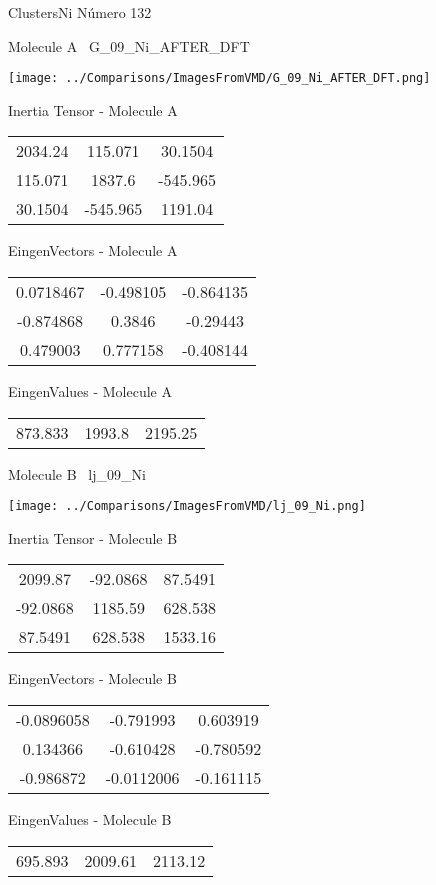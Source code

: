 \newpage

\vtab[-3cm]
\begin{center}
{\large ClustersNi \tab Número 132}
\end{center}
\begin{multicols}{2}
\begin{center}

Molecule A \
G\_09\_Ni\_AFTER\_DFT

\texttt{[image: ../Comparisons/ImagesFromVMD/G\_09\_Ni\_AFTER\_DFT.png]}

Inertia Tensor - Molecule A \\
\begin{tabular}{|c c c|}
2034.24	 & 	115.071	 & 	30.1504	 \\
115.071	 & 	1837.6	 & 	-545.965	 \\
30.1504	 & 	-545.965	 & 	1191.04
\end{tabular}

\vtab
 EingenVectors - Molecule A     \\
\begin{tabular}{|c c c|}
0.0718467	 & 	-0.498105	 & 	-0.864135	 \\
-0.874868	 & 	0.3846	 & 	-0.29443	 \\
0.479003	 & 	0.777158	 & 	-0.408144
\end{tabular}

\vtab
 EingenValues - Molecule A     \\
\begin{tabular}{|c c c|}
873.833	 & 	1993.8	 & 	2195.25	 \\
\end{tabular}
\columnbreak

Molecule B \
lj\_09\_Ni

\texttt{[image: ../Comparisons/ImagesFromVMD/lj\_09\_Ni.png]}

Inertia Tensor - Molecule B \\
\begin{tabular}{|c c c|}
2099.87	 & 	-92.0868	 & 	87.5491	 \\
-92.0868	 & 	1185.59	 & 	628.538	 \\
87.5491	 & 	628.538	 & 	1533.16
\end{tabular}

\vtab
 EingenVectors - Molecule B     \\
\begin{tabular}{|c c c|}
-0.0896058	 & 	-0.791993	 & 	0.603919	 \\
0.134366	 & 	-0.610428	 & 	-0.780592	 \\
-0.986872	 & 	-0.0112006	 & 	-0.161115
\end{tabular}

\vtab
 EingenValues - Molecule B     \\
\begin{tabular}{|c c c|}
695.893	 & 	2009.61	 & 	2113.12	 \\
\end{tabular}

\end{center}
\end{multicols}


